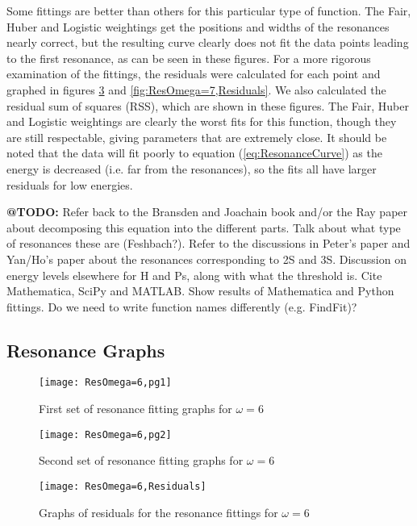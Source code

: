 \documentclass[Dissertation.tex]{subfiles}
\begin{document}
Some fittings are better than others for this particular type of function.  The Fair, Huber and Logistic weightings get the positions and widths of the resonances nearly correct, but the resulting curve clearly does not fit the data points leading to the first resonance, as can be seen in these figures.  For a more rigorous examination of the fittings, the residuals were calculated for each point and graphed in figures \ref{fig:ResOmega=6,Residuals} and \ref{fig:ResOmega=7,Residuals}.  We also calculated the residual sum of squares (RSS), which are shown in these figures.  The Fair, Huber and Logistic weightings are clearly the worst fits for this function, though they are still respectable, giving parameters that are extremely close.  It should be noted that the data will fit poorly to equation (\ref{eq:ResonanceCurve}) as the energy is decreased (i.e. far from the resonances), so the fits all have larger residuals for low energies.

\textbf{@TODO:} Refer back to the Bransden and Joachain book and/or the Ray paper about decomposing this equation into the different parts.  Talk about what type of resonances these are (Feshbach?).  Refer to the discussions in Peter's paper and Yan/Ho's paper about the resonances corresponding to 2S and 3S.  Discussion on energy levels elsewhere for H and Ps, along with what the threshold is.  Cite Mathematica, SciPy and MATLAB.  Show results of Mathematica and Python fittings.  Do we need to write function names differently (e.g. FindFit)?

\subsection{Resonance Graphs}
\label{sec:ResonanceGraphs}

\begin{figure}[H]
	\centering
	\texttt{[image: ResOmega=6,pg1]}
	\caption{First set of resonance fitting graphs for $\omega = 6$}
	\label{fig:ResOmega=6,pg1}
\end{figure}

\begin{figure}[H]
	\centering
	\texttt{[image: ResOmega=6,pg2]}
	\caption{Second set of resonance fitting graphs for $\omega = 6$}
	\label{fig:ResOmega=6,pg2}
\end{figure}

\begin{figure}[H]
	\centering
	\texttt{[image: ResOmega=6,Residuals]}
	\caption{Graphs of residuals for the resonance fittings for $\omega = 6$}
	\label{fig:ResOmega=6,Residuals}
\end{figure}
\end{document}
